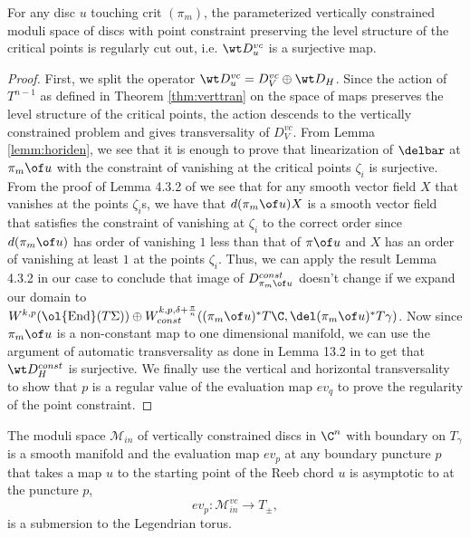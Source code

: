 \begin{Theorem}\label{thm:vctran}
For any disc $u$ touching  crit $(\pi_m)$, the parameterized vertically constrained moduli space of discs with point constraint preserving the level structure of the critical points is regularly cut out, i.e. $\wt D_u^{vc}$ is a surjective map.
\end{Theorem}


\begin{proof}
First, we split the operator $\wt D_u^{vc} = D_V^{vc} \oplus \wt D_H$. Since the action of $T^{n-1}$ as defined in Theorem \ref{thm:verttran} on the space of maps preserves the level structure of the critical points, the action descends to the vertically constrained problem and gives transversality of $D_V^{vc}$. From Lemma \ref{lemm:horiden}, we see that it is enough to prove that linearization of $\delbar$ at $\pi_m \of u $ with the constraint of vanishing at the critical points $\zeta_i$ is surjective. From the proof of Lemma 4.3.2 of \cite{JholoWendl} we see that for any smooth vector field $X$ that vanishes at the points $\zeta_i$s, we have that $d(\pi_m \of u) X$ is a smooth vector field that satisfies the constraint of vanishing at $\zeta_i$ to the correct order since $d(\pi_m \of u)$ has order of vanishing $1$ less than that of $\pi \of u$ and $X$ has an order of vanishing at least $1$ at the points $\zeta_i$. Thus, we can apply the result Lemma 4.3.2 in our case to conclude that image of $ D^{const}_{\pi_m \of u}$ doesn't change if we expand our domain to $W^{k,p} (\ol {\text{End}} (T\Sigma)) \oplus W^{k,p,\delta + \frac{\pi}{n}}_{const}((\pi_m \of u )^*T\C,\del(\pi_m \of u )^*T\gamma)$. Now since $\pi_m \of u$ is a non-constant map to one dimensional manifold, we can use the argument of automatic transversality as done in Lemma 13.2 in \cite{seidelFuk} to get that $\wt D^{const}_H$ is surjective. We finally use the vertical and horizontal transversality to show that $p$ is a regular value of the evaluation map $ev_q$ to prove the regularity of the point constraint.
\end{proof}


\begin{cor} \label{corr:submatch}
The moduli space $\mathcal{M}_{in}$ of vertically constrained discs in $\C^n$ with boundary on $T_\gamma$ is a smooth manifold and the evaluation map $ev_p$ at any boundary puncture $p$ that takes a map $u$ to the starting point of the Reeb chord $u$ is asymptotic to at the puncture $p$, 
$$ev_p : \mathcal{M}^{vc}_{in} \to T_\pm,$$ is a submersion to the Legendrian torus.
\end{cor}

